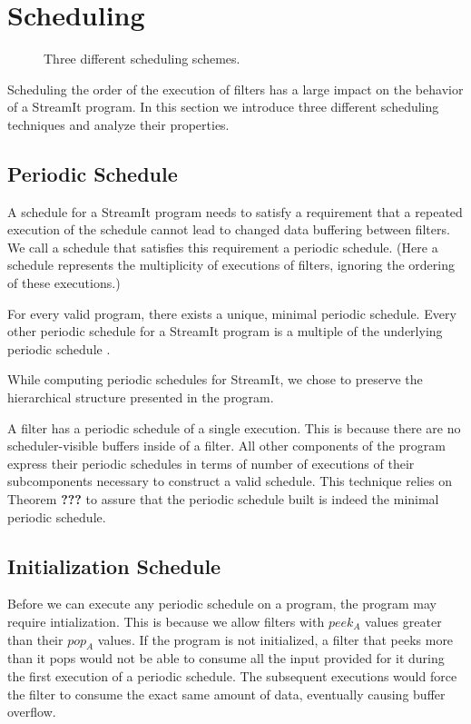 \section{Scheduling}

\begin{figure}
\centering
{}
\caption{Three different scheduling schemes.}
\label{fig:sched}

\end{figure}

Scheduling the order of the execution of filters has a large impact on 
the behavior of a StreamIt program.  In this section we introduce three
different scheduling techniques and analyze their properties.

\subsection{Periodic Schedule}
A schedule for a StreamIt program needs to satisfy a requirement that
a repeated execution of the schedule cannot lead to changed data
buffering between filters.  We call a schedule that satisfies this
requirement a periodic schedule.  (Here a schedule represents the
multiplicity of executions of filters, ignoring the ordering of these
executions.)

For every valid program, there exists a unique, minimal periodic
schedule.  Every other periodic schedule for a StreamIt program is a
multiple of the underlying periodic schedule \cite{bhat1994x3}.

While computing periodic schedules for StreamIt, we chose to preserve the
hierarchical structure presented in the program.

A filter has a periodic schedule of a single execution.  This is
because there are no scheduler-visible buffers inside of a filter.
All other components of the program express their periodic schedules
in terms of number of executions of their subcomponents necessary to
construct a valid schedule.  This technique relies on Theorem {\bf
???} to assure that the periodic schedule built is indeed the minimal
periodic schedule.

\subsection{Initialization Schedule}

Before we can execute any periodic schedule on a program, the program may
require intialization.  This is because we allow filters with $peek_A$ values
greater than their $pop_A$ values.  If the program is not initialized, a filter
that peeks more than it pops would not be able to consume all the input 
provided for it during the first execution of a periodic schedule.  The
subsequent executions would force the filter to consume the exact same amount
of data, eventually causing buffer overflow.


